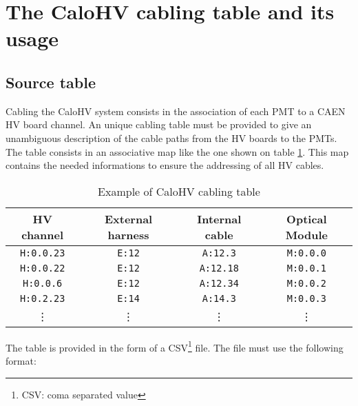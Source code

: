 
\section{The CaloHV cabling table and its usage}

\subsection{Source table}

Cabling the CaloHV system consists in the association of each PMT to a
CAEN HV  board channel.  An unique  cabling table must be  provided to
give an unambiguous description of the  cable paths from the HV boards
to the  PMTs.  The table consists  in an associative map  like the one
shown on  table \ref{tab:calohv:map:1}.  This map contains  the needed
informations to ensure the addressing of all HV cables.

\begin{table}[h]
\begin{center}
\begin{tabular}{|c|c|c|c|}
  \hline
  \textbf{HV channel}& \textbf{External harness} & \textbf{Internal cable} & \textbf{Optical Module} \\
  \hline
  \hline
  \texttt{H:0.0.23}  & \texttt{E:12} & \texttt{A:12.3} & \texttt{M:0.0.0} \\
  \hline
  \texttt{H:0.0.22}  & \texttt{E:12} & \texttt{A:12.18} & \texttt{M:0.0.1} \\
  \hline
  \texttt{H:0.0.6}  & \texttt{E:12} & \texttt{A:12.34} & \texttt{M:0.0.2} \\
  \hline
  \texttt{H:0.2.23}  & \texttt{E:14} & \texttt{A:14.3} & \texttt{M:0.0.3} \\
  \hline
  \vdots          & \vdots  & \vdots   & \vdots             \\  
  \hline
\end{tabular}
\end{center}
\caption{Example of CaloHV cabling table}
\label{tab:calohv:map:1}
\end{table}

\par\noindent The table is provided in the form of a CSV\footnote{CSV:
  coma separated value} file.  The file must use the following format:

